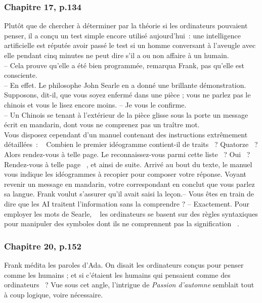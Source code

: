 \documentclass{article}
\begin{document}
			\subsubsection{Chapitre 17, p.134}\label{ada_test_turing}
				Plutôt	 que	 de chercher	à	déterminer	par	la	théorie	si	les	ordinateurs	pouvaient	penser,	il a	 conçu	 un	 test	 simple	 encore utilisé	 aujourd'hui~:	 une	 intelligence artificielle	 est	 réputée	 avoir	 passé le	 test	 si	 un	 homme	 conversant	 à l'aveugle	avec	elle	pendant	cinq	minutes	ne	peut	dire	s'il	a	ou	non	affaire	à
				un	humain.\\
				--	 Cela	 prouve	 qu'elle	 a	 été	 bien	 programmée,	 remarqua	 Frank,	 pas
				qu'elle	est	consciente.\\
				--	 En	 effet.	 Le	 philosophe	 John	 Searle	 en	 a	 donné	 une	 brillante
				démonstration.	Supposons,	dit-il,	que	vous	soyez	enfermé	dans	une	pièce	;
				vous	ne	parlez	pas	le	chinois	et	vous	le	lisez	encore	moins.
				--	Je	vous	le	confirme.\\
				--	Un	Chinois	se	tenant	à	l'extérieur	de	la	pièce	glisse	sous	la	porte	un
				message	 écrit	 en	 mandarin,	 dont	 vous	 ne	 comprenez	 pas	 un	 traître	 mot.\\
				Vous	 disposez	 cependant	 d'un	 manuel	 contenant	 des	 instructions
				extrêmement	détaillées~:	\guillemotleft~	Combien	le	premier	idéogramme	contient-il	de
				traits	~?	 Quatorze	~?	 Alors	 rendez-vous	 à	 telle	 page.	 Le	 reconnaissez-vous
				parmi	 cette	 liste	~?	 Oui	~?	 Rendez-vous	 à	 telle	 page	~\guillemotright,	 et	 ainsi	 de	 suite.
				Arrivé	 au	 bout	 du	 texte,	 le	 manuel	 vous	 indique	 les	 idéogrammes	 à
				recopier	 pour	 composer	 votre	 réponse.	 Voyant	 revenir	 un	 message	 en
				mandarin,	votre	correspondant	en	conclut	que	vous	parlez	sa	langue.
				Frank	voulut	s'assurer	qu'il	avait	saisi	la	leçon.--	Vous	êtes	en	train	de	dire	que	les	AI	traitent	l'information	sans	la
				comprendre	?
				--	Exactement.	Pour	employer	les	mots	de	Searle,	\guillemotleft~	les	ordinateurs	se
				basent	sur	des	règles	syntaxiques	pour	manipuler	des	symboles	dont	ils	ne
				comprennent	pas	la	signification	~\guillemotright.
			\subsubsection{Chapitre 20, p.152}\label{ada_mimesis}
				Frank	médita	les	paroles	d'Ada.	On	disait	les	ordinateurs	conçus	pour
				penser	 comme	 les	 humains	 ;	 et	 si	 c'étaient	 les	 humains	 qui	 pensaient
				comme	 des	 ordinateurs	~?	 Vue	 sous	 cet	 angle,	 l'intrigue	 de	 \textit{Passion
				d'automne}	semblait	tout	à	coup	logique,	voire	nécessaire.
\end{document}
